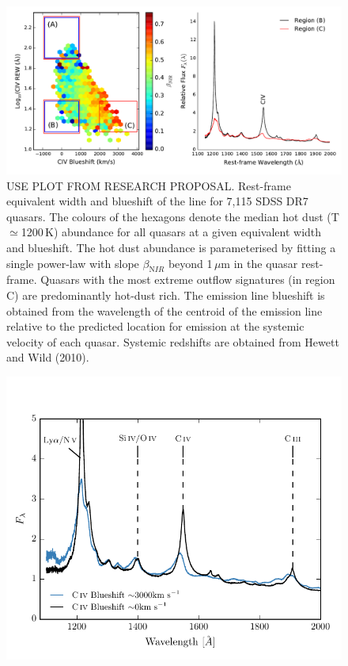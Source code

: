 \begin{figure}
\centering
  \includegraphics[width=\columnwidth]{figures/chapter06/ntt_proposal_figure1.pdf}
\caption{USE PLOT FROM RESEARCH PROPOSAL. Rest-frame equivalent width and blueshift of the  line for 7,115 SDSS DR7 quasars. The colours of the hexagons denote the median hot dust (T$\simeq$1200\,K) abundance for all
quasars at a given equivalent width and blueshift. The hot dust abundance is parameterised by fitting a single power-law with slope $\beta_{\mathrm NIR}$ beyond 1\,$\mu$m in the quasar rest-frame. Quasars with the most extreme outflow signatures (in region C) are predominantly hot-dust rich. The  emission line blueshift is obtained from the wavelength of the centroid of the emission line relative to the predicted location for emission at the systemic velocity of each quasar. Systemic redshifts are obtained from Hewett and Wild (2010).}
  \label{fig:}
\end{figure}


\begin{figure}
\centering
  \includegraphics[width=\columnwidth]{figures/chapter06/blueshift_composite.pdf}
\caption{}
  \label{fig:}
\end{figure}

